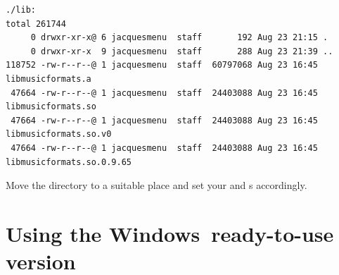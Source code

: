\begin{lstlisting}[language=Terminal]
./lib:
total 261744
     0 drwxr-xr-x@ 6 jacquesmenu  staff       192 Aug 23 21:15 .
     0 drwxr-xr-x  9 jacquesmenu  staff       288 Aug 23 21:39 ..
118752 -rw-r--r--@ 1 jacquesmenu  staff  60797068 Aug 23 16:45 libmusicformats.a
 47664 -rw-r--r--@ 1 jacquesmenu  staff  24403088 Aug 23 16:45 libmusicformats.so
 47664 -rw-r--r--@ 1 jacquesmenu  staff  24403088 Aug 23 16:45 libmusicformats.so.v0
 47664 -rw-r--r--@ 1 jacquesmenu  staff  24403088 Aug 23 16:45 libmusicformats.so.0.9.65
\end{lstlisting}

Move the  directory to a suitable place and set your  and  \environmentVariable s accordingly.


\section{Using the Windows\texttrademark\ ready-to-use version}

